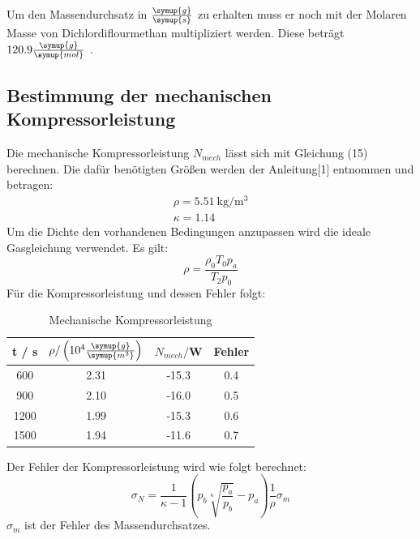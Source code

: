 Um den Massendurchsatz in $\frac{\symup{g}}{\symup{s}}$ zu erhalten muss er noch
mit der Molaren Masse von Dichlordiflourmethan multipliziert werden.
Diese beträgt $120.9\frac{\symup{g}}{\symup{mol}}$ \cite{sample4}.
\subsection{Bestimmung der mechanischen Kompressorleistung}
Die mechanische Kompressorleistung $N_{mech}$ lässt sich mit Gleichung (15) berechnen. Die dafür
benötigten Größen werden der Anleitung[1] entnommen und betragen:
\begin{align*}
  \rho = \SI{5.51}{\kilo\gram\per\cubic\meter} \\
  \kappa = 1.14
\end{align*}
Um die Dichte den vorhandenen Bedingungen anzupassen wird die ideale Gasgleichung
verwendet. Es gilt:
\begin{equation}
  \rho = \frac{\rho_0 T_0 p_a}{T_2 p_0}
\end{equation}
Für die Kompressorleistung und dessen Fehler folgt:
\begin{table}
  \centering
  \caption{Mechanische Kompressorleistung}
  \label{tab:Mechanische Kompressorleistung}
  \begin{tabular}{c c c c}
    \toprule
    t / s  &$\rho/\left(10^{4}\frac{\symup{g}}{\symup{m^3}}\right)$ & $N_{mech}/$W & Fehler \\
    \midrule
     600 & 2.31 & -15.3 & 0.4 \\
     900 & 2.10 & -16.0 & 0.5 \\
    1200 & 1.99 & -15.3 & 0.6 \\
    1500 & 1.94 & -11.6 & 0.7 \\
    \bottomrule
  \end{tabular}
\end{table}

Der Fehler der Kompressorleistung wird wie folgt berechnet:
\begin{equation}
  \sigma_N = \frac{1}{\kappa -1} \left(p_b \sqrt[\kappa]{\frac{p_a}{p_b}}-p_a\right)\frac{1}{\rho} \sigma_m
\end{equation}
$\sigma_m$ ist der Fehler des Massendurchsatzes.
